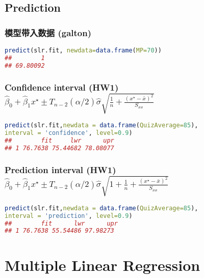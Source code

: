 \documentclass[11pt,a4paper]{article}
\begin{document}
\subsection{Prediction}
\subsubsection{模型带入数据 (galton)}
\begin{lstlisting}[language=R]
predict(slr.fit, newdata=data.frame(MP=70))
##        1 
## 69.80092
\end{lstlisting}
\subsubsection{Confidence interval (HW1) $
\hat{\beta}_{0}+\hat{\beta}_{1} x^{\star} \pm T_{n-2}(\alpha / 2) \hat{\sigma} \sqrt{\frac{1}{n}+\frac{\left(x^{\star}-\bar{x}\right)^{2}}{S_{x x}}}
$}
\begin{lstlisting}[language=R]
predict(slr.fit,newdata = data.frame(QuizAverage=85),
interval = 'confidence', level=0.9)
##        fit     lwr      upr
## 1 76.7638 75.44682 78.08077
\end{lstlisting}
\subsubsection{Prediction interval (HW1) $
\hat{\beta}_{0}+\hat{\beta}_{1} x^{\star} \pm T_{n-2}(\alpha / 2) \hat{\sigma} \sqrt{1+\frac{1}{n}+\frac{\left(x^{\star}-\bar{x}\right)^{2}}{S_{x x}}}
$}
\begin{lstlisting}[language=R]
predict(slr.fit,newdata = data.frame(QuizAverage=85),
interval = 'prediction', level=0.9)
##        fit      lwr      upr
## 1 76.7638 55.54486 97.98273
\end{lstlisting}


\section{Multiple Linear Regression}
\end{document}
